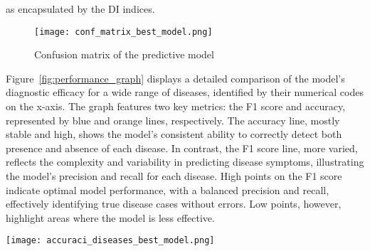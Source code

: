 as encapsulated by the DI indices.
\begin{figure}[h]
	\centering
	\texttt{[image: conf\_matrix\_best\_model.png]}
	\caption{Confusion matrix of the predictive model}\label{fig:conf_matrix}
\end{figure}
\noindent
Figure~\ref{fig:performance_graph} displays a detailed comparison of the model's diagnostic efficacy for a wide range of diseases,
identified by their numerical codes on the x-axis.
The graph features two key metrics: the F1 score and accuracy, represented by blue and orange lines, respectively.
The accuracy line, mostly stable and high, shows the model's consistent ability to correctly detect both presence and absence of each disease.
In contrast, the F1 score line, more varied, reflects the complexity and variability in predicting disease symptoms,
illustrating the model's precision and recall for each disease. High points on the F1 score indicate optimal model performance,
with a balanced precision and recall, effectively identifying true disease cases without errors.
Low points, however, highlight areas where the model is less effective.
\begin{figure*}[htbp]
	\centering
	\texttt{[image: accuraci\_diseases\_best\_model.png]}
	\caption{A comparison of the F1 score and accuracy for each disease predicted by the model.}
	\label{fig:performance_graph}
\end{figure*}
